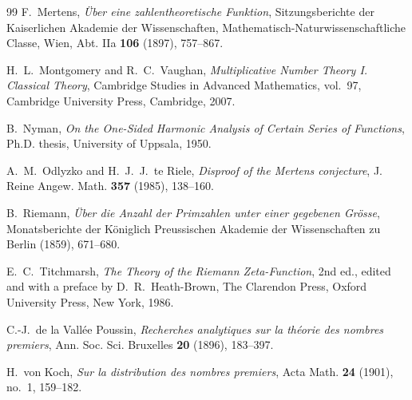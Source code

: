 \begin{thebibliography}{99}
F.~Mertens, \emph{\"Uber eine zahlentheoretische Funktion}, Sitzungsberichte der Kaiserlichen Akademie der Wissenschaften, Mathematisch-Naturwissenschaftliche Classe, Wien, Abt. IIa \textbf{106} (1897), 757--867.

H.~L.~Montgomery and R.~C.~Vaughan, \emph{Multiplicative Number Theory I. Classical Theory}, Cambridge Studies in Advanced Mathematics, vol.~97, Cambridge University Press, Cambridge, 2007.

B.~Nyman, \emph{On the One-Sided Harmonic Analysis of Certain Series of Functions}, Ph.D. thesis, University of Uppsala, 1950.

A.~M.~Odlyzko and H.~J.~J.~te Riele, \emph{Disproof of the Mertens conjecture}, J. Reine Angew. Math. \textbf{357} (1985), 138--160.

B.~Riemann, \emph{\"Uber die Anzahl der Primzahlen unter einer gegebenen Gr\"osse}, Monatsberichte der K\"oniglich Preussischen Akademie der Wissenschaften zu Berlin (1859), 671--680.

E.~C.~Titchmarsh, \emph{The Theory of the Riemann Zeta-Function}, 2nd ed., edited and with a preface by D.~R.~Heath-Brown, The Clarendon Press, Oxford University Press, New York, 1986.

C.-J.~de la Vall\'ee Poussin, \emph{Recherches analytiques sur la th\'eorie des nombres premiers}, Ann. Soc. Sci. Bruxelles \textbf{20} (1896), 183--397.

H.~von Koch, \emph{Sur la distribution des nombres premiers}, Acta Math. \textbf{24} (1901), no.~1, 159--182.

\end{thebibliography}

